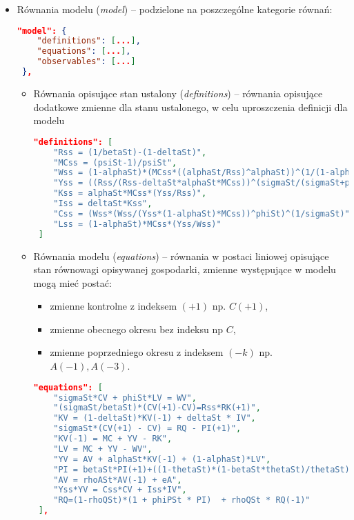 \begin{itemize}
    \item Równania modelu (\emph{model}) -- podzielone na poszczególne kategorie równań:
    \begin{lstlisting}[language=json,firstnumber=5]
 "model": {
    "definitions": [...],
    "equations": [...],
    "observables": [...]
 },
    \end{lstlisting}
        \begin{itemize}
            \item Równania opisujące stan ustalony (\emph{definitions}) -- równania opisujące dodatkowe zmienne dla stanu ustalonego, w celu uproszczenia definicji dla modelu
            \begin{lstlisting}[language=json,firstnumber=6]
 "definitions": [
    "Rss = (1/betaSt)-(1-deltaSt)",
    "MCss = (psiSt-1)/psiSt",
    "Wss = (1-alphaSt)*(MCss*((alphaSt/Rss)^alphaSt))^(1/(1-alphaSt))",
    "Yss = ((Rss/(Rss-deltaSt*alphaSt*MCss))^(sigmaSt/(sigmaSt+phiSt)))*((Wss)*(Wss/((1-alphaSt)*MCss))^phiSt)^(1/(sigmaSt+phiSt))",
    "Kss = alphaSt*MCss*(Yss/Rss)",
    "Iss = deltaSt*Kss",
    "Css = (Wss*(Wss/(Yss*(1-alphaSt)*MCss))^phiSt)^(1/sigmaSt)",
    "Lss = (1-alphaSt)*MCss*(Yss/Wss)"
 ]
            \end{lstlisting}
            \item Równania modelu (\emph{equations}) -- równania w postaci liniowej opisujące stan równowagi opisywanej gospodarki, zmienne występujące w modelu mogą mieć postać:
            \begin{itemize}
                \item zmienne kontrolne z indeksem $(+1)$ np. $C(+1)$,
                \item zmienne obecnego okresu bez indeksu np $C$,
                \item zmienne poprzedniego okresu z indeksem $(-k)$ np. $A(-1), A(-3)$.
            \end{itemize}
            \begin{lstlisting}[language=json,firstnumber=16]
 "equations": [
    "sigmaSt*CV + phiSt*LV = WV",
    "(sigmaSt/betaSt)*(CV(+1)-CV)=Rss*RK(+1)",
    "KV = (1-deltaSt)*KV(-1) + deltaSt * IV",
    "sigmaSt*(CV(+1) - CV) = RQ - PI(+1)",
    "KV(-1) = MC + YV - RK",
    "LV = MC + YV - WV",
    "YV = AV + alphaSt*KV(-1) + (1-alphaSt)*LV",
    "PI = betaSt*PI(+1)+((1-thetaSt)*(1-betaSt*thetaSt)/thetaSt)*MC",
    "AV = rhoASt*AV(-1) + eA",
    "Yss*YV = Css*CV + Iss*IV",
    "RQ=(1-rhoQSt)*(1 + phiPSt * PI)  + rhoQSt * RQ(-1)"
 ],
            \end{lstlisting}
            

\end{itemize}
\end{itemize}

